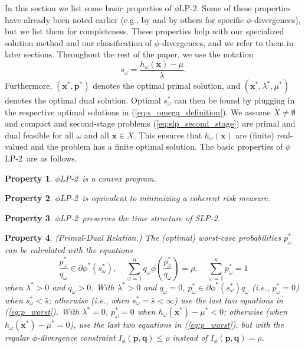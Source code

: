 \documentclass[opre,nonblindrev]{informs3} %
\newcommand{\x}{\mathbf{x}}
\newcommand{\q}{\mathbf{q}}
\newcommand{\p}{\mathbf{p}}
\newtheorem{property}{Property}
\newcommand{\plp}{$\phi$LP-2}
\begin{document}
In this section we list some basic properties of \plp.
Some of these properties have already been noted earlier (e.g., by \citet{bental2011robust} and by others for specific $\phi$-divergences), but we list them for completeness.
These properties help with our specialized solution method and our classification of $\phi$-divergences, and we refer to them in later sections.
Throughout the rest of the paper, we use the notation
\begin{equation}
	s_\omega = \frac{h_\omega(\x) - \mu}{\lambda}. \label{eq:s_omega_definition}
\end{equation}
Furthermore, $(\x^*, \p^*)$ denotes the optimal primal solution, and $(\x^*, \lambda^*, \mu^*)$ denotes the optimal dual solution.
Optimal $s_\omega^*$ can then be found by plugging in the respective optimal solutions in (\ref{eq:s_omega_definition}). 
We assume $X \neq \emptyset$ and compact and second-stage problems (\ref{eq:slp_second_stage}) are primal and dual feasible for all $\omega$ and all $\x \in X$. 
This ensures that $h_\omega(\x)$ are (finite) real-valued  and the problem has a finite optimal solution.  
The basic properties of \plp\ are as follows.


\begin{property}
	\label{property:convex}
	\plp\ is a convex program.
\end{property}

\begin{property}
	\label{property:coherent_risk_measure}
	\plp\ is equivalent to minimizing a coherent risk measure.
\end{property}

\begin{property}
	\label{property:time_structure}
	\plp\ preserves the time structure of SLP-2.
\end{property}

\begin{property} {\sc (Primal-Dual Relation.)}
	\label{property:primal_dual_relation}
	The (optimal) worst-case probabilities $p^*_\omega$ can be calculated with the equations
	\begin{equation}\label{eq:p_worst}
		\frac{p_\omega^*}{q_\omega} \in \partial \phi^*\left(s_\omega^*\right), \ \ \ \ \ \sum_{\omega=1}^n q_\omega \phi\left(\frac{p_\omega^*}{q_\omega}\right) = \rho, \ \ \ \ \ \sum_{\omega=1}^n p_\omega^* = 1
	\end{equation}		
when $\lambda^*>0$ and $q_\omega >0$. 
	With $\lambda^*>0$ and $q_\omega =0$, $p_\omega^* \in \partial \phi^*\left(s_\omega^*\right) q_\omega$ (i.e., $p_\omega^* = 0$) when $s_\omega^* < \bar{s}$; otherwise (i.e., when $s_\omega^* = \bar{s}<\infty$) use the last two equations in (\ref{eq:p_worst}). 
	With $\lambda^*=0$, $p_\omega^* = 0$ when $h_\omega(\x^*) - \mu^* < 0$; otherwise (when $h_\omega(\x^*) - \mu^* = 0$), use the last two equations in (\ref{eq:p_worst}), but with the regular $\phi$-divergence constraint $I_{\phi}(\p,\q)\leq \rho$ instead of $I_{\phi}(\p,\q)=\rho$. 
%
\end{property}
\end{document}
